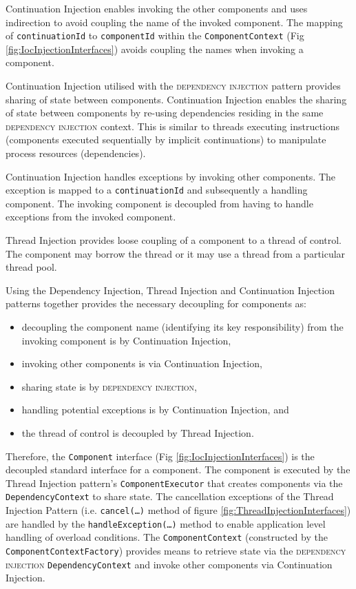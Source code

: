 \documentclass[prodmode]{style/acmlarge}
\begin{document}
Continuation Injection enables invoking the other components and uses
indirection to avoid coupling the name of the invoked component.  The mapping of
\texttt{continuationId} to \texttt{componentId} within the
\texttt{ComponentContext} (Fig \ref{fig:IocInjectionInterfaces}) avoids
coupling the names when invoking a component.

Continuation Injection utilised with the \textsc{dependency injection} pattern
\cite{ioc} provides sharing of state between components.  Continuation Injection
enables the sharing of state between components by re-using dependencies
residing in the same \textsc{dependency injection} context.  This is similar to
threads executing instructions (components executed sequentially by implicit
continuations) to manipulate process resources (dependencies).

Continuation Injection handles exceptions by invoking other components. The
exception is mapped to a \texttt{continuationId} and subsequently a handling
component.  The invoking component is decoupled from having to handle exceptions
from the invoked component.

Thread Injection provides loose coupling of a component to a thread of control.
The component may borrow the thread or it may use a thread from a particular
thread pool.

Using the Dependency Injection, Thread Injection and Continuation Injection
patterns together provides the necessary decoupling for components as:
\begin{itemize}
  \item decoupling the component name (identifying its key responsibility) from the invoking component is by Continuation Injection,
  \item invoking other components is via Continuation Injection,
  \item sharing state is by \textsc{dependency injection},
  \item handling potential exceptions is by Continuation Injection, and
  \item the thread of control is decoupled by Thread Injection.
\end{itemize}

Therefore, the \texttt{Component} interface (Fig
\ref{fig:IocInjectionInterfaces}) is the decoupled standard interface for a
component.  The component is executed by the Thread Injection pattern's
\texttt{ComponentExecutor} that creates components via the
\texttt{DependencyContext} to share state.  The cancellation exceptions of the
Thread Injection Pattern (i.e. \texttt{cancel(\ldots)} method of figure
\ref{fig:ThreadInjectionInterfaces}) are handled by the
\texttt{handleException(\ldots)} method to enable application level handling of
overload conditions.  The \texttt{ComponentContext} (constructed by the
\texttt{ComponentContextFactory}) provides means to retrieve state via the
\textsc{dependency injection} \texttt{Dependency\-Context} and invoke other
components via Continuation Injection.
\end{document}
